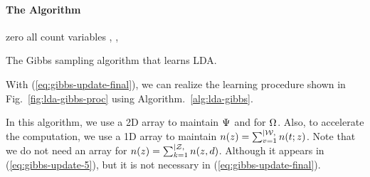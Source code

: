 \paragraph{The Algorithm}


\begin{algorithm}[t]


zero all count variables , ,  \;

\caption{The Gibbs sampling algorithm that learns LDA.}
\label{alg:lda-gibbs}
\end{algorithm}


With (\ref{eq:gibbs-update-final}), we can realize the learning
procedure shown in Fig.~\ref{fig:lda-gibbs-proc} using
Algorithm.~\ref{alg:lda-gibbs}.

In this algorithm, we use a 2D array  to maintain
$\Psi_{}$ and  for $\Omega_{}$.  Also, to accelerate the
computation, we use a 1D array  to maintain
$n(z)=\sum_{v=1}^{|\mathcal{W},}n(t;z)$.  Note that we do not need an
array  for $n(z)=\sum_{k=1}^{|\mathcal{Z},}n(z,d)$.  Although
it appears in (\ref{eq:gibbs-update-5}), but it is not necessary in
(\ref{eq:gibbs-update-final}).


